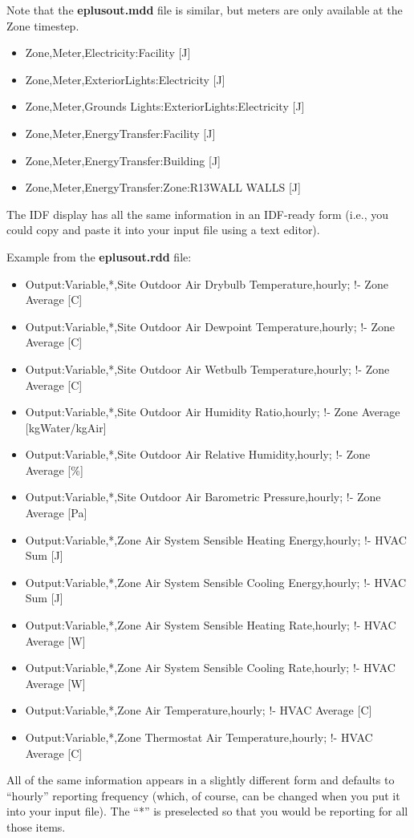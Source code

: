 Note that the \textbf{eplusout.mdd} file is similar, but meters are only available at the Zone timestep.

\begin{itemize}
\item
  Zone,Meter,Electricity:Facility {[}J{]}
\item
  Zone,Meter,ExteriorLights:Electricity {[}J{]}
\item
  Zone,Meter,Grounds Lights:ExteriorLights:Electricity {[}J{]}
\item
  Zone,Meter,EnergyTransfer:Facility {[}J{]}
\item
  Zone,Meter,EnergyTransfer:Building {[}J{]}
\item
  Zone,Meter,EnergyTransfer:Zone:R13WALL WALLS {[}J{]}
\end{itemize}

The IDF display has all the same information in an IDF-ready form (i.e., you could copy and paste it into your input file using a text editor).

Example from the \textbf{eplusout.rdd} file:

\begin{itemize}
\item
  Output:Variable,*,Site Outdoor Air Drybulb Temperature,hourly; !- Zone Average {[}C{]}
\item
  Output:Variable,*,Site Outdoor Air Dewpoint Temperature,hourly; !- Zone Average {[}C{]}
\item
  Output:Variable,*,Site Outdoor Air Wetbulb Temperature,hourly; !- Zone Average {[}C{]}
\item
  Output:Variable,*,Site Outdoor Air Humidity Ratio,hourly; !- Zone Average {[}kgWater/kgAir{]}
\item
  Output:Variable,*,Site Outdoor Air Relative Humidity,hourly; !- Zone Average {[}\%{]}
\item
  Output:Variable,*,Site Outdoor Air Barometric Pressure,hourly; !- Zone Average {[}Pa{]}
\item
  Output:Variable,*,Zone Air System Sensible Heating Energy,hourly; !- HVAC Sum {[}J{]}
\item
  Output:Variable,*,Zone Air System Sensible Cooling Energy,hourly; !- HVAC Sum {[}J{]}
\item
  Output:Variable,*,Zone Air System Sensible Heating Rate,hourly; !- HVAC Average {[}W{]}
\item
  Output:Variable,*,Zone Air System Sensible Cooling Rate,hourly; !- HVAC Average {[}W{]}
\item
  Output:Variable,*,Zone Air Temperature,hourly; !- HVAC Average {[}C{]}
\item
  Output:Variable,*,Zone Thermostat Air Temperature,hourly; !- HVAC Average {[}C{]}
\end{itemize}

All of the same information appears in a slightly different form and defaults to ``hourly'' reporting frequency (which, of course, can be changed when you put it into your input file). The ``*'' is preselected so that you would be reporting for all those items.